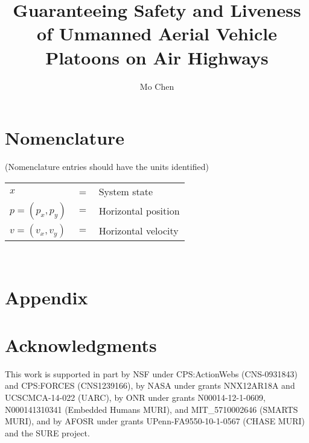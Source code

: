 \documentclass[journal]{aiaa-pretty}
\author{Mo Chen}
\title{Guaranteeing Safety and Liveness of Unmanned Aerial Vehicle Platoons on Air Highways}
\newcommand{\pos}{p} %
\newcommand{\vel}{v} %
\begin{document}
\maketitle

\section*{Nomenclature}
(Nomenclature entries should have the units identified)\\
\noindent\begin{tabular}{@{}lcl@{}}
$x$ &=& System state \\
$\pos=(\pos_x, \pos_y)$ &$=$& Horizontal position \\
$\vel=(\vel_x, \vel_y)$ &$=$& Horizontal velocity
\end{tabular} \\















\section*{Appendix}

\section*{Acknowledgments}
This work is supported in part by NSF under CPS:ActionWebs (CNS-0931843) and CPS:FORCES (CNS1239166), by NASA under grants NNX12AR18A and UCSCMCA-14-022 (UARC), by ONR under grants N00014-12-1-0609, N000141310341 (Embedded Humans MURI), and MIT\_5710002646 (SMARTS MURI), and by AFOSR under grants UPenn-FA9550-10-1-0567 (CHASE MURI) and the SURE project.



\end{document}
